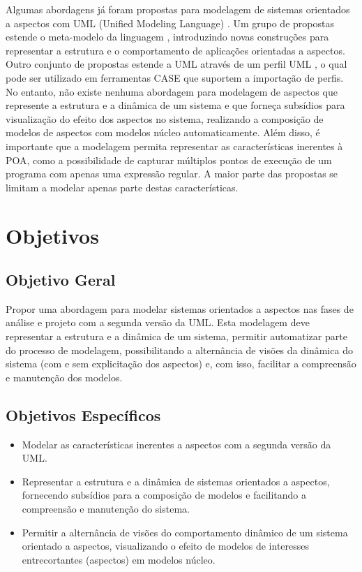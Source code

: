 Algumas abordagens já foram propostas para modelagem de sistemas orientados a aspectos com UML (Unified Modeling Language) \cite{uml:05}. Um
grupo de propostas estende o meta-modelo da linguagem \cite{Kienzle:2009:AMM:1509239.1509252} \cite{theme:04} \cite{Klein:2007:WMA:1805812.1805819} \cite{Jacobson:2004:ASD:1062430} \cite{france:06},
introduzindo novas construções para representar a estrutura e o comportamento de aplicações orientadas a aspectos. Outro conjunto de propostas estende
a UML através de um perfil UML \cite{Evermann:2007:MSP:1229375.1229379} \cite{Cottenier06themotorola} \cite{Cui:2009:MIA:1529282.1529377}, o qual
pode ser utilizado em ferramentas CASE que suportem a importação de perfis. No entanto, não existe nenhuma abordagem para modelagem de aspectos que
represente a estrutura e a dinâmica de um sistema e que forneça subsídios para visualização do efeito dos aspectos no sistema, realizando a
composição de modelos de aspectos com modelos núcleo automaticamente. Além disso, é importante que a modelagem permita representar as características
inerentes à POA, como a possibilidade de capturar múltiplos pontos de execução de um programa com apenas uma expressão regular. A maior parte das propostas se
limitam a modelar apenas parte destas características.

\section{Objetivos}

\subsection{Objetivo Geral}

Propor uma abordagem para modelar sistemas orientados a aspectos nas fases de análise e projeto com a segunda versão da UML. Esta modelagem deve
representar a estrutura e a dinâmica de um sistema, permitir automatizar parte do processo de modelagem, possibilitando a alternância de visões da
dinâmica do sistema (com e sem explicitação dos aspectos) e, com isso, facilitar a compreensão e manutenção dos modelos.

\subsection{Objetivos Específicos}

\begin{itemize}
  \item Modelar as características inerentes a aspectos com a segunda versão da UML.
  \item Representar a estrutura e a dinâmica de sistemas orientados a aspectos, fornecendo subsídios para a composição de modelos e facilitando 
  a compreensão e manutenção do sistema.
  \item Permitir a alternância de visões do comportamento dinâmico de um sistema orientado a aspectos, visualizando o efeito de modelos de
  interesses entrecortantes (aspectos) em modelos núcleo.
\end{itemize}

